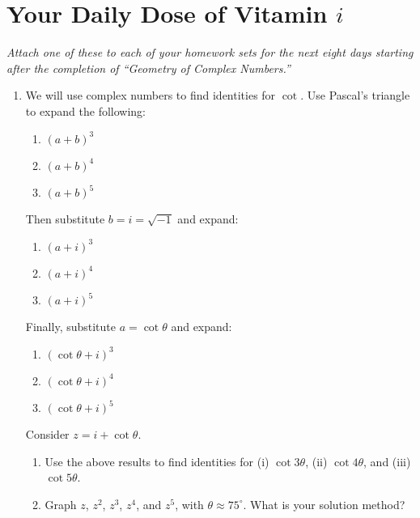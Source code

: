 \documentclass[../gatm.tex]{subfiles}
\begin{document}
\section{Your Daily Dose of Vitamin $i$}

\newcommand{\Arg} {\operatorname{Arg}}
\newcommand{\cis} {\operatorname{cis}}
\newcommand{\Real} {\operatorname{Re}}
\newcommand{\Imag} {\operatorname{Im}}

\textit{Attach one of these to each of your homework sets for the next eight days starting after the completion of ``Geometry of Complex Numbers.''}


\begin{enumerate}
\item We will use complex numbers to find identities for $\cot$. Use Pascal's triangle to expand the following:
\begin{multicols}{3}
\begin{enumerate}
\item $(a+b)^3$
\item $(a+b)^4$
\item $(a+b)^5$
\setcounter{vit_i_problem_ii}{\value{enumii}}
\end{enumerate}
\end{multicols}
Then substitute $b=i=\sqrt{-1}$ and expand:
\begin{multicols}{3}
\begin{enumerate}
\setcounter{enumii}{\value{vit_i_problem_ii}}
\item $(a+i)^3$
\item $(a+i)^4$
\item $(a+i)^5$
\setcounter{vit_i_problem_ii}{\value{enumii}}
\end{enumerate}
\end{multicols}
Finally, substitute $a=\cot \theta$ and expand:
\begin{multicols}{3}
\begin{enumerate}
\setcounter{enumii}{\value{vit_i_problem_ii}}
\item $(\cot \theta +i)^3$
\item $(\cot \theta +i)^4$
\item $(\cot \theta +i)^5$
\setcounter{vit_i_problem_ii}{\value{enumii}}
\end{enumerate}
\end{multicols}
Consider $z=i+\cot\theta$.
\begin{enumerate}
\setcounter{enumii}{\value{vit_i_problem_ii}}
\item Use the above results to find identities for (i) $\cot 3\theta$, (ii) $\cot 4\theta$, and (iii) $\cot 5\theta$.
\item Graph $z$, $z^2$, $z^3$, $z^4$, and $z^5$, with $\theta \approx 75^\circ$. What is your solution method?
\end{enumerate}


\end{enumerate}
\end{document}
